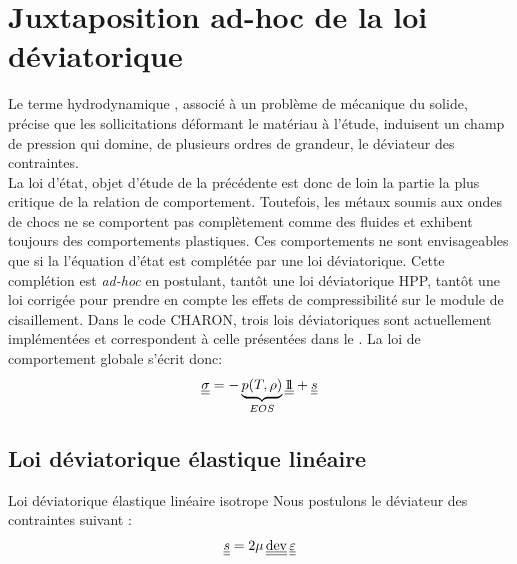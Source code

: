 \documentclass[10pt]{book}
\begin{document}
\section{Juxtaposition ad-hoc de la loi déviatorique}\label{Section:Juxtaposition ad-hoc de la loi déviatorique}
Le terme \og hydrodynamique \fg{}, associé à un problème de mécanique du solide, précise que les sollicitations déformant le matériau à l'étude, induisent un champ de pression qui domine, de plusieurs ordres de grandeur, le déviateur des contraintes.\\

La loi d'état, objet d'étude de la précédente  est donc de loin la partie la plus critique de la relation de comportement. Toutefois, les métaux soumis aux ondes de chocs ne se comportent pas complètement comme des fluides et exhibent toujours des comportements plastiques. Ces comportements ne sont envisageables que si la l'équation d'état est complétée par une loi déviatorique. Cette complétion est \emph{ad-hoc} en postulant, tantôt une loi déviatorique HPP, tantôt une loi corrigée pour prendre en compte les effets de compressibilité sur le module de cisaillement. Dans le code CHARON, trois lois déviatoriques sont actuellement implémentées et correspondent à celle présentées dans le . La loi de comportement globale s'écrit donc:
$$\underline{\underline{\sigma}} = -\underbrace{p(T,\rho)}_{EOS}\underline{\underline{1\!\!1}}+\underline{\underline{s}}$$
\subsection{Loi déviatorique élastique linéaire}
\begin{Propo}{Loi déviatorique élastique linéaire isotrope} Nous postulons le déviateur des contraintes suivant \cite{forest2015mecanique}:
\begin{equation}
\devia =2\mu\dev\DefoHPP
\label{eq:loi_deviateur_HPP_analytique}
\end{equation}
\end{Propo}
\end{document}
